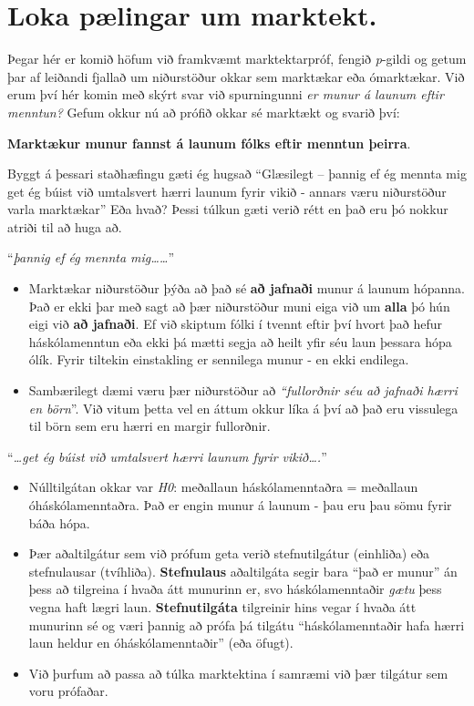 \documentclass[
]{book}
\begin{document}
\hypertarget{loka-puxe6lingar-um-marktekt.}{%
\section{Loka pælingar um marktekt.}\label{loka-puxe6lingar-um-marktekt.}}

Þegar hér er komið höfum við framkvæmt marktektarpróf, fengið \emph{p}-gildi og getum þar af leiðandi fjallað um niðurstöður okkar sem marktækar eða ómarktækar. Við erum því hér komin með skýrt svar við spurningunni \emph{er munur á launum eftir menntun?} Gefum okkur nú að prófið okkar sé marktækt og svarið því:

\textbf{Marktækur munur fannst á launum fólks eftir menntun þeirra}.

Byggt á þessari staðhæfingu gæti ég hugsað ``Glæsilegt -- þannig ef ég mennta mig get ég búist við umtalsvert hærri launum fyrir vikið - annars væru niðurstöður varla marktækar'' Eða hvað? Þessi túlkun gæti verið rétt en það eru þó nokkur atriði til að huga að.

``\emph{þannig ef ég mennta mig\ldots\ldots{}}''

\begin{itemize}
\item
  Marktækar niðurstöður þýða að það sé \textbf{að jafnaði} munur á launum hópanna. Það er ekki þar með sagt að þær niðurstöður muni eiga við um \textbf{alla} þó hún eigi við \textbf{að jafnaði}. Ef við skiptum fólki í tvennt eftir því hvort það hefur háskólamenntun eða ekki þá mætti segja að heilt yfir séu laun þessara hópa ólík. Fyrir tiltekin einstakling er sennilega munur - en ekki endilega.
\item
  Sambærilegt dæmi væru þær niðurstöður að \emph{``fullorðnir séu að jafnaði hærri en börn}''. Við vitum þetta vel en áttum okkur líka á því að það eru vissulega til börn sem eru hærri en margir fullorðnir.
\end{itemize}

``\emph{\ldots get ég búist við umtalsvert hærri launum fyrir vikið\ldots.}''

\begin{itemize}
\item
  Núlltilgátan okkar var \emph{H0}: meðallaun háskólamenntaðra = meðallaun óháskólamenntaðra. Það er engin munur á launum - þau eru þau sömu fyrir báða hópa.
\item
  Þær aðaltilgátur sem við prófum geta verið stefnutilgátur (einhliða) eða stefnulausar (tvíhliða). \textbf{Stefnulaus} aðaltilgáta segir bara ``það er munur'' án þess að tilgreina í hvaða átt munurinn er, svo háskólamenntaðir \emph{gætu} þess vegna haft lægri laun. \textbf{Stefnutilgáta} tilgreinir hins vegar í hvaða átt munurinn sé og væri þannig að prófa þá tilgátu ``háskólamenntaðir hafa hærri laun heldur en óháskólamenntaðir'' (eða öfugt).
\item
  Við þurfum að passa að túlka marktektina í samræmi við þær tilgátur sem voru prófaðar.
\end{itemize}
\end{document}
